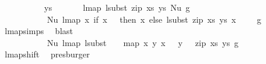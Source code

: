 \begin{isabellebody}
\ \ \ \isamarkupfalse%
\isanewline
\ \ \ \ \ \isamarkupfalse%
\ ys\isanewline
\ \ \ \ \ \isamarkupfalse%
\ {\isachardoublequoteopen}lmap\ {\isacharparenleft}{\kern0pt}lsubst\ {\isacharparenleft}{\kern0pt}zip\ xs\ ys{\isacharparenright}{\kern0pt}{\isacharparenright}{\kern0pt}\ {\isacharparenleft}{\kern0pt}Nu\ g{\isacharparenright}{\kern0pt}\ {\isacharequal}{\kern0pt}\isanewline
\ \ \ \ \ \ \ \ \ \ \ Nu\ {\isacharparenleft}{\kern0pt}lmap\ {\isacharparenleft}{\kern0pt}{\isasymlambda}x{\isachardot}{\kern0pt}\ if\ x\ {\isacharequal}{\kern0pt}\ {}\ then\ x\ else\ {\isacharparenleft}{\kern0pt}lsubst\ {\isacharparenleft}{\kern0pt}zip\ xs\ ys{\isacharparenright}{\kern0pt}\ {\isacharparenleft}{\kern0pt}x\ {\isacharminus}{\kern0pt}\ {}{\isacharparenright}{\kern0pt}\ {\isacharplus}{\kern0pt}\ {}{\isacharparenright}{\kern0pt}{\isacharparenright}{\kern0pt}\ g{\isacharparenright}{\kern0pt}{\isachardoublequoteclose}\isanewline
\ \ \ \ \ \ \ \isamarkupfalse%
\ lmap{\isachardot}{\kern0pt}simps{\isacharparenleft}{\kern0pt}{}{\isacharparenright}{\kern0pt}\ \isamarkupfalse%
\ blast\isanewline
\ \ \ \ \ \isamarkupfalse%
\ \isamarkupfalse%
\ {\isachardoublequoteopen}{\isachardot}{\kern0pt}{\isachardot}{\kern0pt}{\isachardot}{\kern0pt}\ {\isacharequal}{\kern0pt}\isanewline
\ \ \ \ \ \ \ \ \ \ \ Nu\ {\isacharparenleft}{\kern0pt}lmap\ {\isacharparenleft}{\kern0pt}lsubst\ {\isacharparenleft}{\kern0pt}{\isacharparenleft}{\kern0pt}{}{\isacharcomma}{\kern0pt}\ {}{\isacharparenright}{\kern0pt}\ {\isacharhash}{\kern0pt}\ map\ {\isacharparenleft}{\kern0pt}{\isasymlambda}{\isacharparenleft}{\kern0pt}x{\isacharcomma}{\kern0pt}\ y{\isacharparenright}{\kern0pt}{\isachardot}{\kern0pt}\ {\isacharparenleft}{\kern0pt}x\ {\isacharplus}{\kern0pt}\ {}{\isacharcomma}{\kern0pt}\ y\ {\isacharplus}{\kern0pt}\ {}{\isacharparenright}{\kern0pt}{\isacharparenright}{\kern0pt}\ {\isacharparenleft}{\kern0pt}zip\ xs\ ys{\isacharparenright}{\kern0pt}{\isacharparenright}{\kern0pt}{\isacharparenright}{\kern0pt}\ g{\isacharparenright}{\kern0pt}{\isachardoublequoteclose}\isanewline
\ \ \ \ \ \ \ \isamarkupfalse%
\ lmap{\isacharunderscore}{\kern0pt}shift{}\ \isamarkupfalse%
\ presburger\isanewline
\ \ \ \ \ \isamarkupfalse%
\ \isamarkupfalse%
\ {\isachardoublequoteopen}{\isachardot}{\kern0pt}{\isachardot}{\kern0pt}{\isachardot}{\kern0pt}\ {\isacharequal}{\kern0pt}\isanewline

\end{isabellebody}
